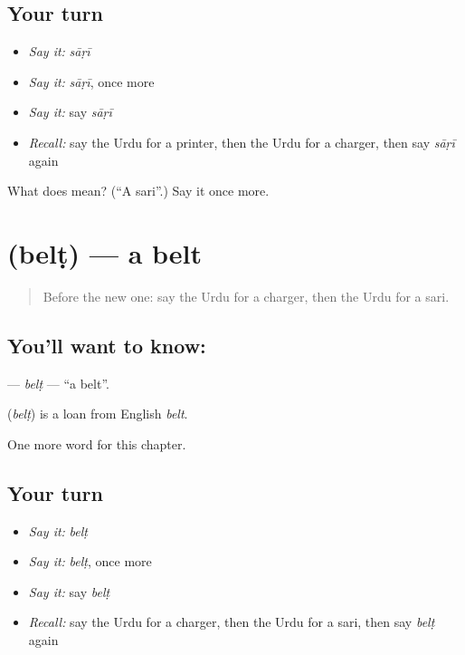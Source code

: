 \subsection*{Your turn}
\begin{itemize}
\raggedright
  \item \emph{Say it:} \emph{sāṛī}
  \item \emph{Say it:} \emph{sāṛī}, once more
  \item \emph{Say it:} say \emph{sāṛī}
  \item \emph{Recall:} say the Urdu for a printer, then the Urdu for a charger, then say \emph{sāṛī} again
\end{itemize}

\begin{tcolorbox}[breakable,colback=teal!4,colframe=teal!35!black,title={Before you move on}]
What does  mean? (\textquotedblleft{}A sari\textquotedblright{}.) Say it once more.
\end{tcolorbox}
\section[\texorpdfstring{\ur{بیلٹ} (belṭ)}{بیلٹ (belṭ)}]{ (belṭ) — a belt}

\label{lesson:UR-C166-belt}



\begin{quote}
Before the new one: say the Urdu for a charger, then the Urdu for a sari.
\end{quote}

\subsection*{You'll want to know: }
\textbf{} — \emph{belṭ} — \textquotedblleft{}a belt\textquotedblright{}.

\begin{cousinweb}
\textbf{} (\emph{belṭ}) is a loan from English \emph{belt}.
\end{cousinweb}

\begin{grammarlens}[title={What you've built}]
One more word for this chapter.
\end{grammarlens}

\subsection*{Your turn}
\begin{itemize}
\raggedright
  \item \emph{Say it:} \emph{belṭ}
  \item \emph{Say it:} \emph{belṭ}, once more
  \item \emph{Say it:} say \emph{belṭ}
  \item \emph{Recall:} say the Urdu for a charger, then the Urdu for a sari, then say \emph{belṭ} again
\end{itemize}


